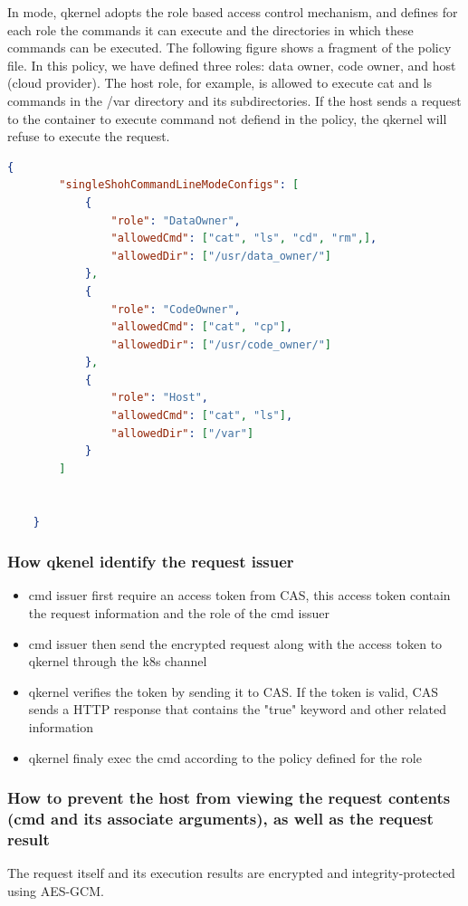 In mode, qkernel adopts the role based access control mechanism, and defines for each role the commands it can execute and the directories in which these commands can be executed. 
The following figure shows a fragment of the policy file. In this policy, we have defined three roles: data owner, code owner, and host (cloud provider). The host role, for example, is allowed 
to execute cat and ls commands in the /var directory and its subdirectories. If the host sends a request to the container to execute command not defiend in the policy, the qkernel will refuse 
to execute the request.
\begin{lstlisting}[language=json,firstnumber=1]
    {
        "singleShohCommandLineModeConfigs": [
            {   
                "role": "DataOwner",
                "allowedCmd": ["cat", "ls", "cd", "rm",],
                "allowedDir": ["/usr/data_owner/"]
            },
            {   
                "role": "CodeOwner",
                "allowedCmd": ["cat", "cp"],
                "allowedDir": ["/usr/code_owner/"]
            },
            {   
                "role": "Host",
                "allowedCmd": ["cat", "ls"],
                "allowedDir": ["/var"]
            }
        ]
    
    
    }
\end{lstlisting}



\subsubsection{How qkenel identify the request issuer}
\begin{itemize}
    \item  cmd issuer first require an access token from CAS, this access token contain the request information and the role of the cmd issuer
    \item  cmd issuer then send the encrypted request along with the access token to qkernel through the k8s channel
    \item  qkernel verifies the token by sending it to CAS. If the token is valid, CAS sends a HTTP response that contains the "true" keyword and other related information
    \item  qkernel finaly exec the cmd according to the policy defined for the role
\end{itemize}
\subsubsection{How to prevent the host from viewing the request contents (cmd and its associate arguments), as well as the request result}
The request itself and its execution results are encrypted and integrity-protected using AES-GCM.


